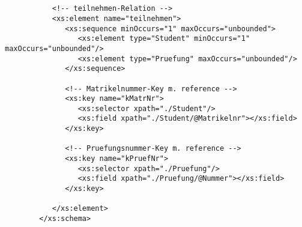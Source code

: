 \begin{verbatim}
		
		
		
		
		
		
		
		
		   <!-- teilnehmen-Relation -->
		   <xs:element name="teilnehmen">
		      <xs:sequence minOccurs="1" maxOccurs="unbounded">
		         <xs:element type="Student" minOccurs="1" maxOccurs="unbounded"/>
		         <xs:element type="Pruefung" maxOccurs="unbounded"/>
		      </xs:sequence>
		   
		      <!-- Matrikelnummer-Key m. reference -->
		      <xs:key name="kMatrNr">
		         <xs:selector xpath="./Student"/>
		         <xs:field xpath="./Student/@Matrikelnr"></xs:field>
		      </xs:key>
		      
		      <!-- Pruefungsnummer-Key m. reference -->
		      <xs:key name="kPruefNr">
		         <xs:selector xpath="./Pruefung"/>
		         <xs:field xpath="./Pruefung/@Nummer"></xs:field>
		      </xs:key>
		   
		   </xs:element>
		</xs:schema>
	\end{verbatim}
